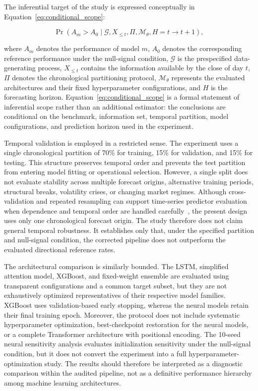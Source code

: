 \documentclass[utf8]{FrontiersinHarvard} %
\newcommand{\rev}[1]{{\color{red}#1}}
\begin{document}
The inferential target of the study is expressed conceptually in Equation~\ref{eq:conditional_scope}:

\begin{equation}
	\Pr\!\left(
	A_m>A_0
	\mid
	\mathcal{G},
	X_{\leq t},
	\Pi,
	\mathcal{M}_{\theta},
	H=t\rightarrow t+1
	\right),
	\label{eq:conditional_scope}
\end{equation}

where \(A_m\) denotes the performance of model \(m\), \(A_0\) denotes the corresponding reference performance under the null-signal condition, \(\mathcal{G}\) is the prespecified data-generating process, \(X_{\leq t}\) contains the information available by the close of day \(t\), \(\Pi\) denotes the chronological partitioning protocol, \(\mathcal{M}_{\theta}\) represents the evaluated architectures and their fixed hyperparameter configurations, and \(H\) is the forecasting horizon. Equation~\ref{eq:conditional_scope} is a formal statement of inferential scope rather than an additional estimator: the conclusions are conditional on the benchmark, information set, temporal partition, model configurations, and prediction horizon used in the experiment.

Temporal validation is employed in a restricted sense. The experiment uses a single chronological partition of 70\% for training, 15\% for validation, and 15\% for testing. This structure preserves temporal order and prevents the test partition from entering model fitting or operational selection. However, a single split does not evaluate stability across multiple forecast origins, alternative training periods, structural breaks, volatility crises, or changing market regimes. \rev{Although cross-validation and repeated resampling can support time-series predictor evaluation when dependence and temporal order are handled carefully~\citep{Bergmeir2012}, the present design uses only one chronological forecast origin.} The study therefore does not claim general temporal robustness. It establishes only that, under the specified partition and null-signal condition, the corrected pipeline does not outperform the evaluated directional reference rates.

The architectural comparison is similarly bounded. The LSTM, simplified attention model, XGBoost, and fixed-weight ensemble are evaluated using transparent configurations and a common target subset, but they are not exhaustively optimized representatives of their respective model families. XGBoost uses validation-based early stopping, whereas the neural models retain their final training epoch. Moreover, the protocol does not include systematic hyperparameter optimization, best-checkpoint restoration for the neural models, or a complete Transformer architecture with positional encoding. \rev{The 10-seed neural sensitivity analysis evaluates initialization sensitivity under the null-signal condition, but it does not convert the experiment into a full hyperparameter-optimization study.} The results should therefore be interpreted as a diagnostic comparison within the audited pipeline, not as a definitive performance hierarchy among machine learning architectures.
\end{document}
